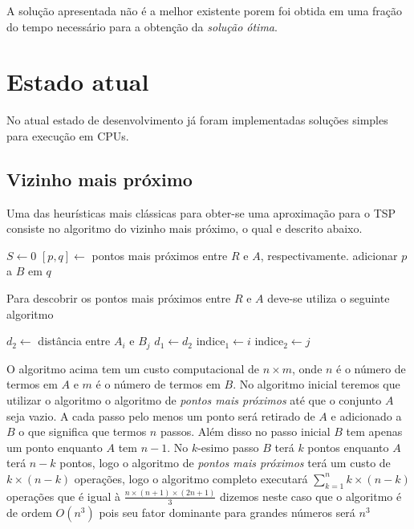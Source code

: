 \documentclass[a4paper, 12pt]{article}
\begin{document}
	A solução apresentada não é a melhor existente porem foi obtida em uma
fração do tempo necessário para a obtenção da \emph{solução ótima}.


\section{Estado atual}

	No atual estado de desenvolvimento já foram implementadas soluções simples
para execução em CPUs.


\subsection{Vizinho mais próximo}

	Uma das heurísticas mais clássicas para obter-se uma aproximação para o TSP
consiste no algoritmo do vizinho mais próximo, o qual e descrito abaixo.




\begin{algorithmic}
 \State $S \leftarrow 0$
  \State $ [p,q] \leftarrow$ pontos mais próximos entre $R$ e $A$,
respectivamente.
  \State adicionar $p$ a $B$ em $q$
 \EndWhile
\end{algorithmic}

	Para descobrir os pontos mais próximos entre $R$ e $A$ deve-se utiliza o
seguinte algoritmo

\begin{algorithmic}
			\State $d_2 \leftarrow $ distância entre $A_i$ e $B_j$
				\State $d_1 \leftarrow d_2$
				\State $\textrm{indice}_1 \leftarrow i$
				\State $\textrm{indice}_2 \leftarrow j$
			\EndIf
		\EndFor
	\EndFor
\end{algorithmic}

	O algoritmo acima tem um custo computacional de $n\times m$, onde $n$ é o
número de termos em $A$ e $m$ é o número de termos em $B$. No algoritmo inicial
teremos que utilizar o algoritmo o algoritmo de \emph{pontos mais próximos} até
que o conjunto $A$ seja vazio. A cada passo pelo menos um ponto será retirado de
$A$ e adicionado a $B$ o que significa que termos $n$ passos. Além disso no
passo inicial $B$ tem apenas um ponto enquanto $A$ tem $n-1$. No $k$-esimo passo
$B$ terá $k$ pontos enquanto $A$ terá $n-k$ pontos, logo o algoritmo de
\emph{pontos mais próximos} terá um custo de $k\times(n-k)$ operações, logo o
algoritmo completo executará $\sum_{k=1}^{n} k\times (n-k)$ operações que é
igual à $\frac{n\times(n+1)\times(2n+1)}{3}$ dizemos neste caso que o algoritmo
é de ordem $O(n^3)$ pois seu fator dominante para grandes números será $n^3$
\end{document}
